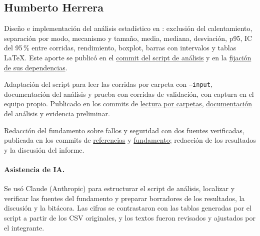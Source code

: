 \subsection{Humberto Herrera}

Diseño e implementación del análisis estadístico en :
exclusión del calentamiento, separación por modo, mecanismo y tamaño, media,
mediana, desviación, p95, IC del 95\,\% entre corridas, rendimiento, boxplot,
barras con intervalos y tablas LaTeX. Este aporte se publicó en el
\href{https://github.com/BelindaTZ/GA-SUM-02-PE-U1/commit/61fe5a331c1f7344a141e6620e44c408affe0e51}{commit del script de análisis}
y en la
\href{https://github.com/BelindaTZ/GA-SUM-02-PE-U1/commit/149722e525bd43abbe8aec9439b90a81d6d25913}{fijación de sus dependencias}.

Adaptación del script para leer las corridas por carpeta con \texttt{--input},
documentación del análisis y prueba con corridas de validación, con captura en
el equipo propio. Publicado en los commits de
\href{https://github.com/BelindaTZ/GA-SUM-02-PE-U1/commit/8dda8bb4a8c886883d87039e964bb6f02efca582}{lectura por carpetas},
\href{https://github.com/BelindaTZ/GA-SUM-02-PE-U1/commit/28050e577c37830a9533a02ba3a7d0d0dadc6a15}{documentación del análisis}
y \href{https://github.com/BelindaTZ/GA-SUM-02-PE-U1/commit/f05eb95f3016aa2d766dbc0046d7de4c32c63152}{evidencia preliminar}.

Redacción del fundamento sobre fallos y seguridad con dos fuentes verificadas,
publicada en los commits de
\href{https://github.com/BelindaTZ/GA-SUM-02-PE-U1/commit/885a863a06a22915a02c46cd3abf7fdfded32e81}{referencias}
y \href{https://github.com/BelindaTZ/GA-SUM-02-PE-U1/commit/45b85e63588e7fd218c4d049d06ef9c54653d968}{fundamento};
redacción de los resultados y la discusión del informe.

\paragraph{Asistencia de IA.}
Se usó Claude (Anthropic) para estructurar el script de análisis, localizar y
verificar las fuentes del fundamento y preparar borradores de los resultados, la
discusión y la bitácora. Las cifras se contrastaron con las tablas generadas por
el script a partir de los CSV originales, y los textos fueron revisados y
ajustados por el integrante.